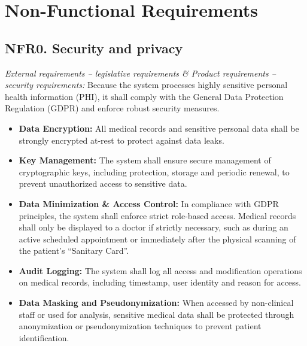 \documentclass[12pt, a4paper]{article}
\begin{document}
\newpage

\newpage
\section{Non-Functional Requirements}

\subsection{NFR0. Security and privacy} \label{NFR0}
    \textit{External requirements -- legislative requirements \& Product requirements -- security requirements:}
    Because the system processes highly sensitive personal health information (PHI), it shall comply with the General Data Protection Regulation (GDPR) and enforce robust security measures.


\begin{itemize}
    \item \textbf{Data Encryption:} All medical records and sensitive personal data shall be strongly encrypted at-rest to protect against data leaks. 
    
    \item \textbf{Key Management:} The system shall ensure secure management of cryptographic keys, including protection, storage and periodic renewal, to prevent unauthorized access to sensitive data.

    \item \textbf{Data Minimization \& Access Control:} In compliance with GDPR principles, the system shall enforce strict role-based access. Medical records shall only be displayed to a doctor if strictly necessary, such as during an active scheduled appointment or immediately after the physical scanning of the patient's ``Sanitary Card''.

    \item \textbf{Audit Logging:} The system shall log all access and modification operations on medical records, including timestamp, user identity and reason for access.

    \item \textbf{Data Masking and Pseudonymization:} When accessed by non-clinical staff or used for analysis, sensitive medical data shall be protected through anonymization or pseudonymization techniques to prevent patient identification.
\end{itemize}
\\ 
\\ 
\\ 
\\ 
\\ 
\end{document}
